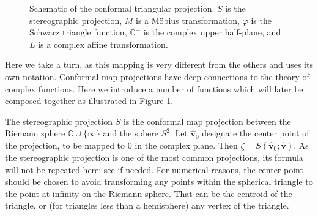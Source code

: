 \documentclass{amsart}[12pt]
\begin{document}
\begin{figure}
\caption{Schematic of the conformal triangular projection. $S$ is the stereographic
projection, $M$ is a M\"obius transformation, $\varphi$ is the Schwarz triangle
function, $\mathbb{C}^+$ is the complex upper half-plane,
and $L$ is a complex affine transformation.}
\label{fig:conformal}
\end{figure}

Here we take a turn, as this mapping is very different from the others and
uses its own notation. Conformal map projections have deep connections to the
theory of complex functions. Here we introduce a number of functions which
will later be composed together as illustrated in Figure \ref{fig:conformal}.

The stereographic projection $S$ is the conformal map projection between the
Riemann sphere $\mathbb{C} \cup \{\infty\}$ and the sphere $S^2$. Let
$\mathbf{\hat{v}}_0$ designate the center point of the projection, to be
mapped to 0 in the complex plane. Then $\zeta = S\left(\mathbf{\hat{v}}_0;
\mathbf{\hat{v}}\right)$. As the stereographic projection is one of the most
common projections, its formula will not be repeated here: see \cite{snyder87}
if needed. For numerical reasons, the center point should be chosen to avoid
transforming any points within the spherical triangle to the point at infinity
on the Riemann sphere. That can be the centroid of the triangle, or (for
triangles less than a hemisphere) any vertex of the triangle.
\end{document}
